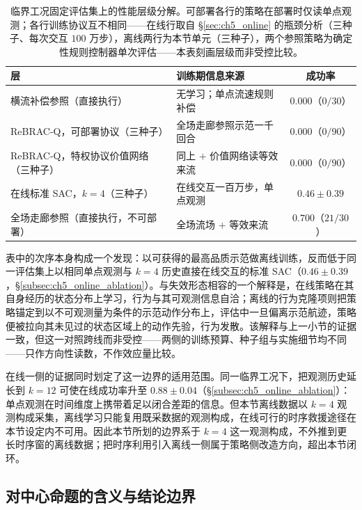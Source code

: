 \begin{table}[t]
\centering
\caption{临界工况固定评估集上的性能层级分解。可部署各行的策略在部署时仅读单点观测；各行训练协议互不相同——在线行取自 \S\ref{sec:ch5_online} 的瓶颈分析（三种子、每次交互 $100$ 万步），离线两行为本节单元（三种子），两个参照策略为确定性规则控制器单次评估——本表刻画层级而非受控比较。}
\label{tab:ch5_boundary_ceiling}
\small
\begin{tabular}{l l c}
\toprule
\textbf{层} & \textbf{训练期信息来源} & \textbf{成功率} \\
\midrule
横流补偿参照（直接执行） & 无学习；单点流速规则补偿 & $0.000$（$0/30$） \\
ReBRAC-Q，可部署协议（三种子） & 全场走廊参照示范一千回合 & $0.000$（$0/90$） \\
ReBRAC-Q，特权协议价值网络（三种子） & 同上 $+$ 价值网络读等效来流 & $0.000$（$0/90$） \\
在线标准 SAC，$k=4$（三种子） & 在线交互一百万步，单点观测 & $0.46 \pm 0.39$ \\
全场走廊参照（直接执行，不可部署） & 全场流场 $+$ 等效来流 & $0.700$（$21/30$） \\
\bottomrule
\end{tabular}
\end{table}

表中的次序本身构成一个发现：以可获得的最高品质示范做离线训练，反而低于同一评估集上以相同单点观测与 $k=4$ 历史直接在线交互的标准 SAC（$0.46 \pm 0.39$，\S\ref{subsec:ch5_online_ablation}）。与失效形态相容的一个解释是，在线策略在其自身经历的状态分布上学习，行为与其可观测信息自洽；离线的行为克隆项则把策略锚定到以不可观测量为条件的示范动作分布上，评估中一旦偏离示范航迹，策略便被拉向其未见过的状态区域上的动作先验，行为发散。该解释与上一小节的证据一致，但这一对照跨线而非受控——两侧的训练预算、种子组与实施细节均不同——只作方向性读数，不作效应量比较。

在线一侧的证据同时划定了这一边界的适用范围。同一临界工况下，把观测历史延长到 $k=12$ 可使在线成功率升至 $0.88 \pm 0.04$（\S\ref{subsec:ch5_online_ablation}）：单点观测在时间维度上携带着足以闭合差距的信息。但本节离线数据以 $k=4$ 观测构成采集，离线学习只能复用既采数据的观测构成，在线可行的时序救援途径在本节设定内不可用。因此本节所划的边界系于 $k=4$ 这一观测构成，不外推到更长时序窗的离线数据；把时序利用引入离线一侧属于策略侧改造方向，超出本节闭环。

\subsection{对中心命题的含义与结论边界}\label{subsec:ch5_boundary_implications}

